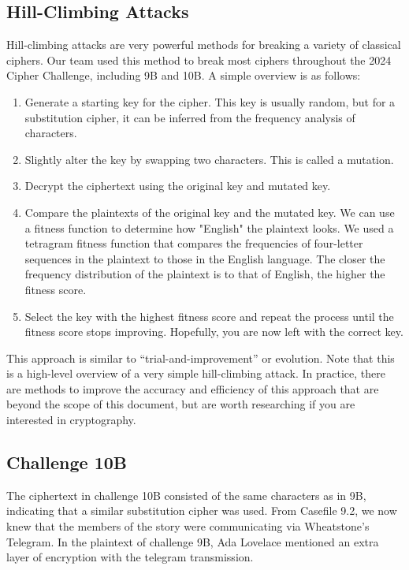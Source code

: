 \subsection*{Hill-Climbing Attacks}

Hill-climbing attacks are very powerful methods for breaking a variety of classical ciphers. Our team used this method to break most ciphers throughout the 2024 Cipher Challenge, including 9B and 10B. A simple overview is as follows:

\begin{enumerate}
    \item Generate a starting key for the cipher. This key is usually random, but for a substitution cipher, it can be inferred from the frequency analysis of characters.
    \item Slightly alter the key by swapping two characters. This is called a mutation.
    \item Decrypt the ciphertext using the original key and mutated key.
    \item Compare the plaintexts of the original key and the mutated key. We can use a fitness function to determine how "English" the plaintext looks. We used a tetragram fitness function that compares the frequencies of four-letter sequences in the plaintext to those in the English language. The closer the frequency distribution of the plaintext is to that of English, the higher the fitness score.
    \item Select the key with the highest fitness score and repeat the process until the fitness score stops improving. Hopefully, you are now left with the correct key.
\end{enumerate}

This approach is similar to \enquote{trial-and-improvement} or evolution. Note that this is a high-level overview of a very simple hill-climbing attack. In practice, there are methods to improve the accuracy and efficiency of this approach that are beyond the scope of this document, but are worth researching if you are interested in cryptography.

\subsection*{Challenge 10B}
The ciphertext in challenge 10B consisted of the same characters as in 9B, indicating that a similar substitution cipher was used. From Casefile 9.2, we now knew that the members of the story were communicating via Wheatstone's Telegram. In the plaintext of challenge 9B, Ada Lovelace mentioned an extra layer of encryption with the telegram transmission.

